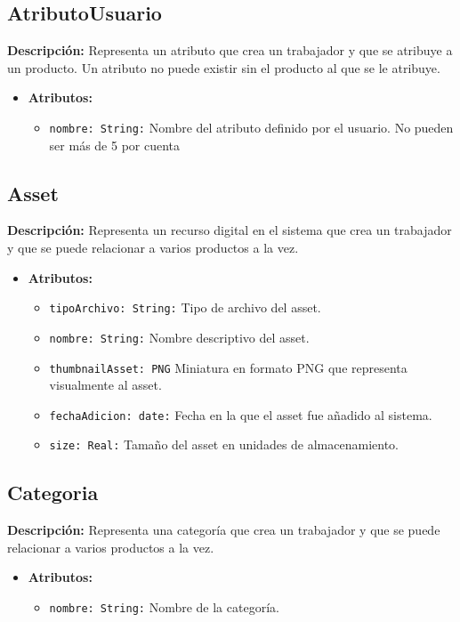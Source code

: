 \documentclass[12pt.a4paper]{article}
\begin{document}
\subsection{AtributoUsuario}
\textbf{Descripción:} Representa un atributo que crea un trabajador y que se atribuye a un producto. Un atributo no puede existir sin el producto al que se le atribuye.
    \begin{itemize}
        \item {\textbf{Atributos:}}
        \begin{itemize}
            \item \texttt{nombre: String:} Nombre del atributo definido por el usuario. No pueden ser más  de 5 por cuenta
        \end{itemize}
    \end{itemize}

\subsection{Asset}
\textbf{Descripción:} Representa un recurso digital en el sistema que crea un trabajador y que se puede relacionar a varios productos a la vez.
    \begin{itemize}
        \item {\textbf{Atributos:}}
        \begin{itemize}
            \item \texttt{tipoArchivo: String:} Tipo de archivo del asset.
            \item \texttt{nombre: String:} Nombre descriptivo del asset.
            \item \texttt{thumbnailAsset: PNG} Miniatura en formato PNG que representa visualmente al asset.
            \item \texttt{fechaAdicion: date:} Fecha en la que el asset fue añadido al sistema.
            \item \texttt{size: Real:} Tamaño del asset en unidades de almacenamiento.
        \end{itemize}
    \end{itemize}

\subsection{Categoria}
\textbf{Descripción:} Representa una categoría que crea un trabajador y que se puede relacionar a varios productos a la vez.
    \begin{itemize}
        \item {\textbf{Atributos:}}
        \begin{itemize}
            \item \texttt{nombre: String:} Nombre de la categoría.
        \end{itemize}
    \end{itemize}
\end{document}
